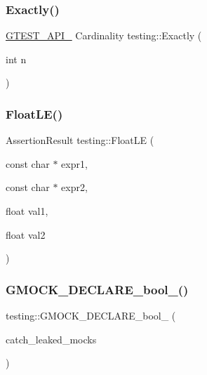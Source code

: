 \mbox{\label{namespacetesting_aa9b1b32ba9e8d3db8ac0af0fc8785c8d}} 
\subsubsection{\texorpdfstring{Exactly()}{Exactly()}}
{\footnotesize\ttfamily \mbox{\hyperlink{_obj__test_2lib_2googletest-release-1_88_81_2googletest_2include_2gtest_2internal_2gtest-port_8h_aa73be6f0ba4a7456180a94904ce17790}{G\+T\+E\+S\+T\+\_\+\+A\+P\+I\+\_\+}} Cardinality testing\+::\+Exactly (\begin{DoxyParamCaption}\item[{int}]{n }\end{DoxyParamCaption})}

\mbox{\label{namespacetesting_a2c9a2a391c72a7b02ea3024586e33af0}} 
\subsubsection{\texorpdfstring{FloatLE()}{FloatLE()}}
{\footnotesize\ttfamily Assertion\+Result testing\+::\+Float\+LE (\begin{DoxyParamCaption}\item[{const char $\ast$}]{expr1,  }\item[{const char $\ast$}]{expr2,  }\item[{float}]{val1,  }\item[{float}]{val2 }\end{DoxyParamCaption})}

\mbox{\label{namespacetesting_a9dd7591091234b86ce48ce1aff6feeb5}} 
\subsubsection{\texorpdfstring{GMOCK\_DECLARE\_bool\_()}{GMOCK\_DECLARE\_bool\_()}}
{\footnotesize\ttfamily testing\+::\+G\+M\+O\+C\+K\+\_\+\+D\+E\+C\+L\+A\+R\+E\+\_\+bool\+\_\+ (\begin{DoxyParamCaption}\item[{catch\+\_\+leaked\+\_\+mocks}]{ }\end{DoxyParamCaption})}

